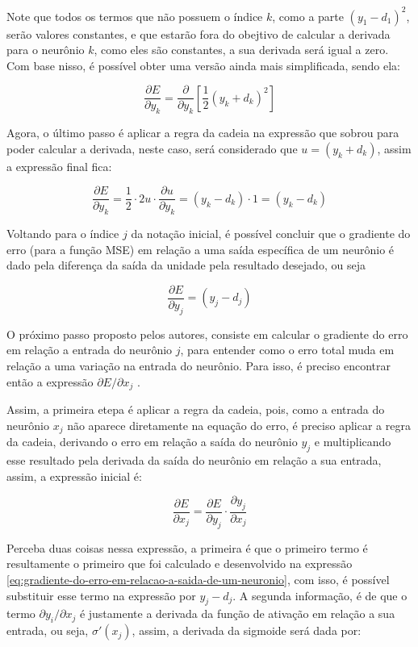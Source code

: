 Note que todos os termos que não possuem o índice $k$, como a parte $(y_1 - d_1)^2$, serão valores constantes, e que estarão fora do obejtivo de calcular a derivada para o neurônio $k$, como eles são constantes, a sua derivada será igual a zero. Com base nisso, é possível obter uma versão ainda mais simplificada, sendo ela:

\[
    \frac{\partial E}{\partial y_k} = \frac{\partial}{\partial y_k} \left[ \frac{1}{2} (y_k + d_k)^2 \right]
\]

Agora, o último passo é aplicar a regra da cadeia na expressão que sobrou para poder calcular a derivada, neste caso, será considerado que $u = (y_k + d_k)$, assim a expressão final fica:

\[
    \frac{\partial E}{\partial y_k} = \frac{1}{2} \cdot 2u \cdot \frac{\partial u}{\partial y_k} = (y_k - d_k) \cdot 1 = (y_k - d_k)
\]

Voltando para o índice $j$ da notação inicial, é possível concluir que o gradiente do erro (para a função MSE) em relação a uma saída específica de um neurônio é dado pela diferença da saída da unidade pela resultado desejado, ou seja

\[
    \frac{\partial E}{\partial y_j} = (y_j - d_j) 
\]

O próximo passo proposto pelos autores, consiste em calcular o gradiente do erro em relação a entrada do neurônio $j$, para entender como o erro total muda em relação a uma variação na entrada do neurônio. Para isso, é preciso encontrar então a expressão $\partial E / \partial x_j$ \parencite{BackpropagationArticle}.

Assim, a primeira etepa é aplicar a regra da cadeia, pois, como a entrada do neurônio $x_j$ não aparece diretamente na equação do erro, é preciso aplicar a regra da cadeia, derivando o erro em relação a saída do neurônio $y_j$ e multiplicando esse resultado pela derivada da saída do neurônio em relação a sua entrada, assim, a expressão inicial é:

\[
    \frac{\partial E}{\partial x_j} = \frac{\partial E}{\partial y_j} \cdot \frac{\partial y_j}{\partial x_j}
\]

Perceba duas coisas nessa expressão, a primeira é que o primeiro termo é resultamente o primeiro que foi calculado e desenvolvido na expressão \ref{eq:gradiente-do-erro-em-relacao-a-saida-de-um-neuronio}, com isso, é possível substituir esse termo na expressão por $y_j - d_j$. A segunda informação, é de que o termo $\partial y_i / \partial x_j$ é justamente a derivada da função de ativação em relação a sua entrada, ou seja, $\sigma'(x_j)$, assim, a derivada da sigmoide será dada por:

